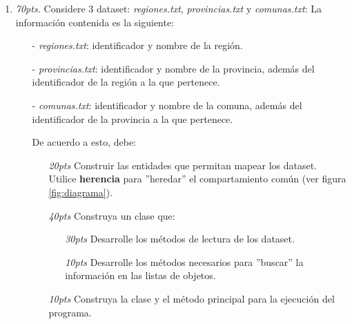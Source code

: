 \documentclass[10pt]{article}
\begin{document}
{\begin{enumerate}
        \item \emph{70pts.} Considere 3 dataset: \emph{regiones.txt}, \emph{provincias.txt} y \emph{comunas.txt}: La informaci\'on contenida es la siguiente:
        \begin{enumerate}
            \item[-] \emph{regiones.txt}: identificador y nombre de la regi\'on.
            \item[-] \emph{provincias.txt}: identificador y nombre de la provincia, adem\'as del identificador de la regi\'on a la que pertenece.
            \item[-] \emph{comunas.txt}: identificador y nombre de la comuna, adem\'as del identificador de la provincia a la que pertenece.
            \item[] De acuerdo a esto, debe:
        \begin{enumerate}
            \item[\emph{20pts}] Construir las entidades que permitan mapear los dataset. Utilice \textbf{herencia} para ''heredar'' el compartamiento com\'un (ver figura \ref{fig:diagrama}).
            \item[\emph{40pts}] Construya un clase que:
            \begin{enumerate}[label=(\alph*)]
                \item[\emph{30pts}] Desarrolle los m\'etodos de lectura de los dataset.
                \item[\emph{10pts}] Desarrolle los m\'etodos necesarios para ''buscar'' la informaci\'on en las listas de objetos.
            \end{enumerate}
            \item[\emph{10pts}] Construya la clase y el m\'etodo principal para la ejecuci\'on del programa.
        \end{enumerate}
         \end{enumerate}
    \end{enumerate}

}
\end{document}
